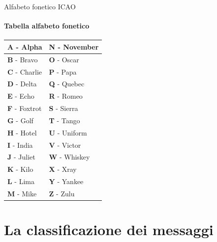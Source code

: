 \documentclass[aspectratio=169]{beamer}
\begin{document}
\begin{frame}{Alfabeto fonetico ICAO}
	\framesubtitle{Tabella alfabeto fonetico}
	
	\begin{table}[!ht]
		\centering
		\begin{tabular}{|l|l|}
			\hline
			\textbf{A} - Alpha & \textbf{N} - November \\ \hline
			\textbf{B} - Bravo & \textbf{O} - Oscar \\ \hline
			\textbf{C} - Charlie & \textbf{P} - Papa \\ \hline
			\textbf{D} - Delta & \textbf{Q} - Quebec \\ \hline
			\textbf{E} - Echo & \textbf{R} - Romeo \\ \hline
			\textbf{F} - Foxtrot & \textbf{S} - Sierra \\ \hline
			\textbf{G} - Golf & \textbf{T} - Tango \\ \hline
			\textbf{H} - Hotel & \textbf{U} - Uniform \\ \hline
			\textbf{I} - India & \textbf{V} - Victor \\ \hline
			\textbf{J} - Juliet & \textbf{W} - Whiskey \\ \hline
			\textbf{K} - Kilo & \textbf{X} - Xray \\ \hline
			\textbf{L} - Lima & \textbf{Y} - Yankee \\ \hline
			\textbf{M} - Mike & \textbf{Z} - Zulu \\ \hline
		\end{tabular}
	\end{table}
\end{frame}

\section{La classificazione dei messaggi}
\begin{frame}
	\\
\end{frame}
\end{document}
